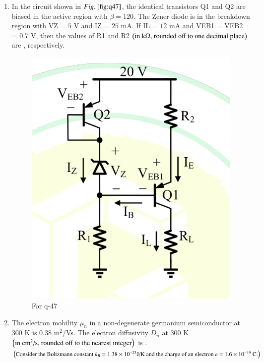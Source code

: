 \documentclass[journal,12pt,onecolumn]{IEEEtran}
\theoremstyle{remark}
\begin{document}
\begin{enumerate}
\hfill{}

\begin{enumerate}
\end{enumerate}

\item In the circuit shown in $\figref{fig:q47}$, the identical transistors Q1 and Q2 are biased in the active region with $\beta = 120$. The Zener diode is in the breakdown region with VZ = $5$ V and IZ = $25$ mA. If IL = $12$ mA and VEB1 = VEB2 = $0.7$ V, then the values of R1 and R2 $\left(\text{in k}\ohm\text{, rounded off to one decimal place}\right)$ are \underline{\hspace{2cm}}, respectively.
\begin{figure}[H]
\centering
\includegraphics[width=0.3\columnwidth]{q47}
\caption{For q-47}
\label{fig:q47}
\end{figure}

\hfill{}

\begin{enumerate}
\end{enumerate}

\item The electron mobility $\mu_n$ in a non-degenerate germanium semiconductor at $300$ K is $0.38$ m$^2$/Vs. The electron diffusivity $D_n$ at $300$ K $\left(\text{in cm}^2\text{/s, rounded off to the nearest integer}\right)$ is \underline{\hspace{2cm}}. $\left(\text{Consider the Boltzmann constant } k_B = 1.38 \times 10^{-23} \text{J/K and the charge of an electron } e = 1.6 \times 10^{-19} \text{ C.}\right)$


\end{enumerate}
\end{document}
